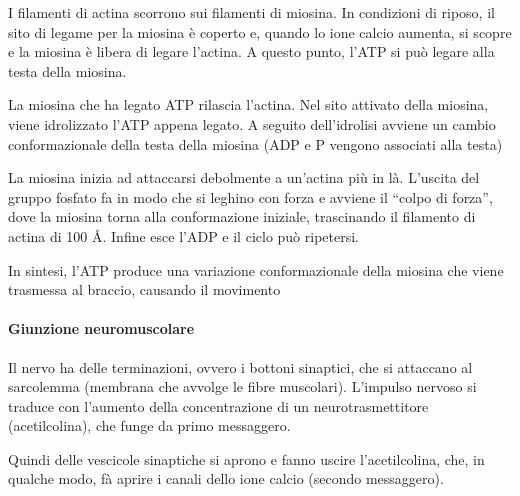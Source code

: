 
\clearpage

I filamenti di actina scorrono sui filamenti di miosina. In condizioni di riposo, il sito di legame per la miosina è coperto e, quando lo ione calcio aumenta, si scopre e la miosina è libera di legare l'actina. A questo punto, l'ATP si può legare alla testa della miosina.

La miosina che ha legato ATP rilascia l'actina. Nel sito attivato della miosina, viene idrolizzato l'ATP appena legato. A seguito dell'idrolisi avviene un cambio conformazionale della testa della miosina (ADP e P vengono associati alla testa)


La miosina inizia ad attaccarsi debolmente a un’actina più in là. L'uscita del gruppo fosfato fa in modo che si leghino con forza e avviene il ``colpo di forza'', dove la miosina torna alla conformazione iniziale, trascinando il filamento di actina di 100 \AA. Infine esce l'ADP e il ciclo può ripetersi.


In sintesi, l'ATP produce una variazione conformazionale della miosina che viene trasmessa al braccio, causando il movimento


\clearpage

\paragraph{Giunzione neuromuscolare}
Il nervo ha delle terminazioni, ovvero i bottoni sinaptici, che si attaccano al sarcolemma (membrana che avvolge le fibre muscolari). L'impulso nervoso si traduce con l'aumento della concentrazione di un neurotrasmettitore (acetilcolina), che funge da primo messaggero.

Quindi delle vescicole sinaptiche si aprono e fanno uscire l'acetilcolina, che, in qualche modo, fà aprire i canali dello ione calcio (secondo messaggero).

